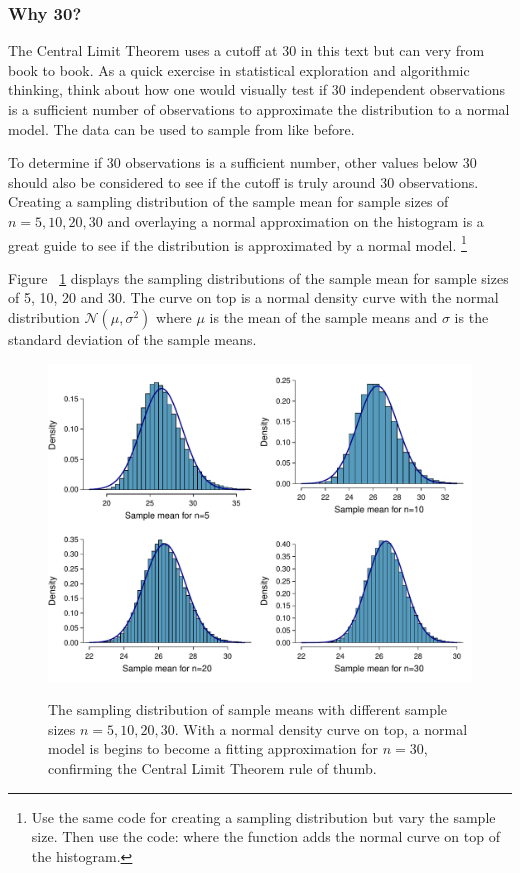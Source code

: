 \subsubsection{Why 30?}
\label{why30}

The Central Limit Theorem uses a cutoff at 30 in this text but can very from book to book. As a quick exercise in statistical exploration and algorithmic thinking, think about how one would visually test if 30 independent observations is a sufficient number of observations to approximate the distribution to a normal model.  The  data can be used to sample from like before. 

To determine if 30 observations is a sufficient number, other values below 30 should also be considered to see if the cutoff is truly around 30 observations. Creating a sampling distribution of the sample mean for sample sizes of $n=5,10,20,30$ and overlaying a normal approximation on the histogram is a great guide to see if the distribution is approximated by a normal model. \footnote{Use the same code for creating a sampling distribution but vary the sample size. Then use the code: 
 where the function  adds the normal curve on top of the histogram.}

Figure ~\ref{cltThirty} displays the sampling distributions of the sample mean for sample sizes of 5, 10, 20 and 30. The curve on top is a normal density curve with the normal distribution $\mathcal{N}(\mu, \sigma^2)$ where $\mu$ is the mean of the sample means and $\sigma$ is the standard deviation of the sample means.

\begin{figure}[hht] 
   \centering
   \includegraphics[width=\textwidth]{ch_inference_foundations_oi_biostat/figures/clt30/clt30}
   \label{cltThirty}
   \caption{The sampling distribution of sample means with different sample sizes $n=5, 10, 20, 30$. With a normal density curve on top, a normal model is begins to become a fitting approximation for  $n=30$, confirming the Central Limit Theorem rule of thumb.}
\end{figure}

